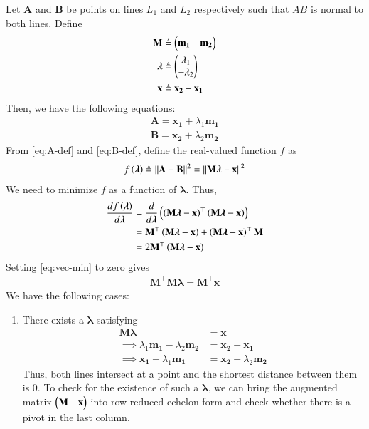\documentclass[journal,12pt,twocolumn]{IEEEtran}
\renewcommand{\vec}[1]{\boldsymbol{\mathbf{#1}}}
\begin{document}
\begin{enumerate}
    \solution Let $\vec{A}$ and $\vec{B}$ be points on lines $L_1$ and $L_2$
    respectively such that $AB$ is normal to both lines. Define
    \begin{align}
        \vec{M} &\triangleq \myvec{\vec{m_1} & \vec{m_2}} \label{eq:M-def} \\
        \vec{\lambda} &\triangleq \myvec{\lambda_1\\-\lambda_2} \label{eq:lambda-def} \\
        \vec{x} &\triangleq \vec{x_2} - \vec{x_1} \label{eq:x-def}
    \end{align}
    Then, we have the following equations:
    \begin{align}
        \vec{A} = \vec{x_1} + \lambda_1\vec{m_1} \label{eq:A-def} \\
        \vec{B} = \vec{x_2} + \lambda_2\vec{m_2} \label{eq:B-def}
    \end{align}
    From \eqref{eq:A-def} and \eqref{eq:B-def}, define the real-valued function
    $f$ as
    \begin{align}
        f\brak{\vec{\lambda}} \triangleq \norm{\vec{A}-\vec{B}}^2 = \norm{\vec{M}\vec{\lambda}-\vec{x}}^2
        \label{eq:f-def}
    \end{align}
    We need to minimize $f$ as a function of $\vec{\lambda}$. Thus,
    \begin{align}
        \frac{df\brak{\vec{\lambda}}}{d\vec{\lambda}} &= \frac{d}{d\vec{\lambda}}\brak{\brak{\vec{M\lambda}-\vec{x}}^\top\brak{\vec{M\lambda}-\vec{x}}} \\
                                                      &= \vec{M}^\top\brak{\vec{M\lambda}-\vec{x}} + \brak{\vec{M\lambda}-\vec{x}}^\top\vec{M} \\
                                                      &= 2\vec{M}^\top\brak{\vec{M\lambda}-\vec{x}}
        \label{eq:vec-min}
    \end{align}
    Setting \eqref{eq:vec-min} to zero gives
    \begin{align}
        \vec{M}^\top\vec{M\lambda} = \vec{M}^\top\vec{x}
        \label{eq:vec-eqn}
    \end{align}
    We have the following cases:
    \begin{enumerate}
        \item There exists a $\vec{\lambda}$ satisfying
        \begin{align}
            \vec{M}\vec{\lambda} &= \vec{x} \\
            \implies \lambda_1\vec{m_1} - \lambda_2\vec{m_2} &= \vec{x_2}-\vec{x_1} \\
            \implies \vec{x_1} + \lambda_1\vec{m_1} &= \vec{x_2} + \lambda_2\vec{m_2}
            \label{eq:intersect}
        \end{align}
        Thus, both lines intersect at a point and the shortest
        distance between them is 0. To check for the existence of such a 
        $\vec{\lambda}$, we can bring the augmented matrix 
        $\myvec{\vec{M}&\vec{x}}$ into row-reduced echelon form and check 
        whether there is a pivot in the last column.


\end{enumerate}
\end{enumerate}
\end{document}
